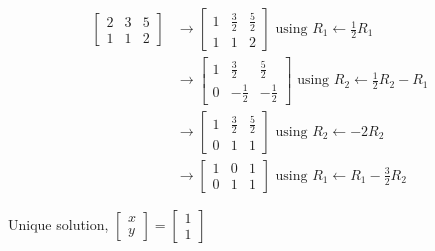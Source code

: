 \documentclass[11pt]{article}
\begin{document}
\begin{align*}
    \left[ \begin{array}{cc|c} 2 & 3 & 5 \\ 1 & 1 & 2 \end{array} \right] &\rightarrow \left[ \begin{array}{cc|c} 1 & \frac{3}{2} & \frac{5}{2} \\ 1 & 1 & 2 \end{array} \right] \text{ using } R_1 \leftarrow \frac{1}{2}R_1
    \\
    &\rightarrow \left[ \begin{array}{cc|c} 1 & \frac{3}{2} & \frac{5}{2} \\ 0 & -\frac{1}{2} & -\frac{1}{2} \end{array} \right] \text{ using } R_2 \leftarrow \frac{1}{2} R_2 - R_1
    \\
    &\rightarrow \left[ \begin{array}{cc|c} 1 & \frac{3}{2} & \frac{5}{2} \\ 0 & 1 & 1 \end{array} \right] \text{ using } R_2 \leftarrow -2R_2
    \\
    &\rightarrow \left[ \begin{array}{cc|c} 1 & 0 & 1 \\ 0 & 1 & 1 \end{array} \right] \text{ using } R_1 \leftarrow R_1 - \frac{3}{2}R_2
\end{align*}

Unique solution, $\begin{bmatrix} x \\ y \end{bmatrix} = \begin{bmatrix} 1 \\ 1 \end{bmatrix}$ \\
\end{document}
